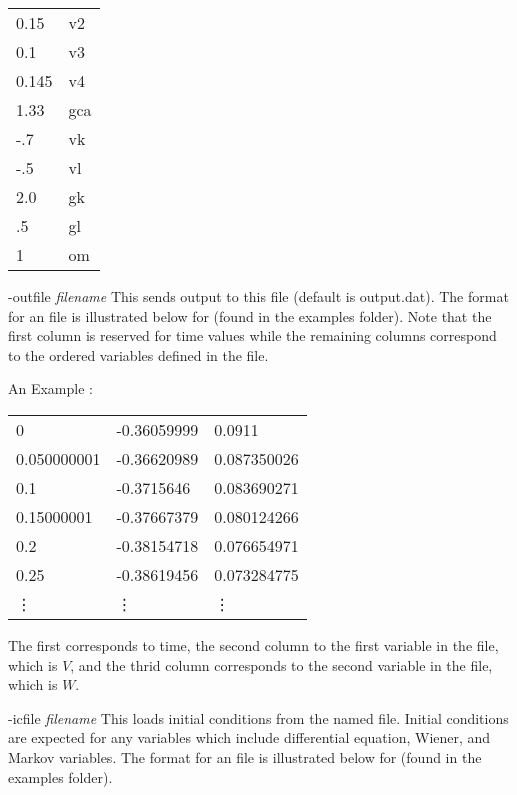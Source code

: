 \begin{description}
\begin{center}
\begin{minipage}{55ex}
\begin{tabular}{ll}
0.15 & v2\\
0.1 & v3\\
0.145 & v4\\
1.33 & gca\\
-.7 & vk\\
-.5 & vl\\
2.0 & gk\\
.5 & gl\\
1 & om
\end{tabular}
\end{minipage}
\end{center}
\item{-outfile \emph{filename}} This sends output to this file (default is output.dat).  The format for an {} file is illustrated below for {} (found in the examples {} folder).  Note that the first column is reserved for time values while the remaining columns correspond to the ordered variables defined in the {} file.  
\begin{center}
\begin{minipage}{55ex}
\begin{center}An Example {}:
\end{center}\ttfamily
\begin{tabular}{lll}
0 & -0.36059999 & 0.0911 \\
0.050000001 & -0.36620989 & 0.087350026 \\ 
0.1 & -0.3715646 & 0.083690271 \\
0.15000001 & -0.37667379 & 0.080124266 \\ 
0.2 & -0.38154718 & 0.076654971 \\
0.25 & -0.38619456 & 0.073284775 \\ 
\vdots & \vdots & \vdots\\
\end{tabular}
\end{minipage}
\end{center}
The first corresponds to time, the second column to the first variable in the {} file, which is $V$, and the thrid column corresponds to the second variable in the {} file, which is $W$. 
\item{-icfile \emph{filename}} This loads initial conditions from the named file. Initial conditions are expected for any variables which include differential equation, Wiener, and Markov variables.  The format for an {} file is illustrated below for {} (found in the examples {} folder).  

\end{description}
